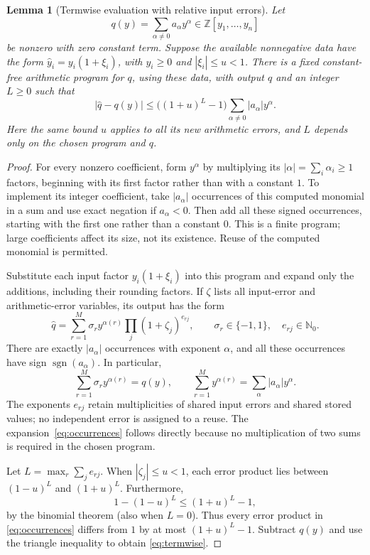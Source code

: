 \documentclass[11pt,a4paper]{article}
\numberwithin{equation}{section}
\newtheorem{lemma}[theorem]{Lemma}
\theoremstyle{definition}
\theoremstyle{remark}
\newcommand{\Z}{\mathbb Z}
\newcommand{\NN}{\mathbb N_0}
\newcommand{\abs}[1]{\left|#1\right|}
\newcommand{\sgn}{\operatorname{sgn}}
\begin{document}
\begin{lemma}[Termwise evaluation with relative input errors]
\label{lem:termwise}
Let
\[
 q(y)=\sum_{\alpha\ne0}a_\alpha y^\alpha\in\Z[y_1,\ldots,y_n]
\]
be nonzero with zero constant term.  Suppose the available nonnegative
data have the form $\widehat y_i=y_i(1+\xi_i)$, with $y_i\ge0$ and
$\abs{\xi_i}\le u<1$.  There is a fixed constant-free arithmetic
program for $q$, using these data, with output $\widehat q$ and an integer
$L\ge0$ such that
\begin{equation}\label{eq:termwise}
 \abs{\widehat q-q(y)}
 \le\bigl((1+u)^L-1\bigr)
 \sum_{\alpha\ne0}\abs{a_\alpha}y^\alpha.
\end{equation}
Here the same bound $u$ applies to all its new arithmetic errors, and
$L$ depends only on the chosen program and $q$.
\end{lemma}

\begin{proof}
For every nonzero coefficient, form $y^\alpha$ by multiplying its
$\abs\alpha=\sum_i\alpha_i\ge1$ factors, beginning with its first
factor rather than with a constant $1$.  To implement its integer
coefficient, take $\abs{a_\alpha}$ occurrences of this computed monomial
in a sum and use exact negation if $a_\alpha<0$.  Then add all these
signed occurrences, starting with the first one rather than a constant
$0$.  This is a finite program; large coefficients affect its size, not
its existence.  Reuse of the computed monomial is permitted.

Substitute each input factor $y_i(1+\xi_i)$ into this program and expand
only the additions, including their rounding factors.  If $\zeta$ lists
all input-error and arithmetic-error variables, its output has the form
\begin{equation}\label{eq:occurrences}
 \widehat q
 =\sum_{r=1}^{M}\sigma_r y^{\alpha(r)}
       \prod_j(1+\zeta_j)^{e_{rj}},
 \qquad \sigma_r\in\{-1,1\},\quad e_{rj}\in\NN.
\end{equation}
There are exactly $\abs{a_\alpha}$ occurrences with exponent $\alpha$,
and all these occurrences have sign $\sgn(a_\alpha)$.  In particular,
\[
 \sum_{r=1}^M\sigma_r y^{\alpha(r)}=q(y),
 \qquad
 \sum_{r=1}^M y^{\alpha(r)}
 =\sum_\alpha\abs{a_\alpha}y^\alpha.
\]
The exponents $e_{rj}$ retain multiplicities of shared input errors and
shared stored values; no independent error is assigned to a reuse.
The expansion~\eqref{eq:occurrences} follows directly because no
multiplication of two sums is required in the chosen program.

Let $L=\max_r\sum_j e_{rj}$.  When $\abs{\zeta_j}\le u<1$, each error
product lies between $(1-u)^L$ and $(1+u)^L$.  Furthermore,
\[
 1-(1-u)^L\le(1+u)^L-1,
\]
by the binomial theorem (also when $L=0$).  Thus every error product in
\eqref{eq:occurrences} differs from $1$ by at most $(1+u)^L-1$.
Subtract $q(y)$ and use the triangle inequality to obtain
\eqref{eq:termwise}.
\end{proof}
\end{document}
